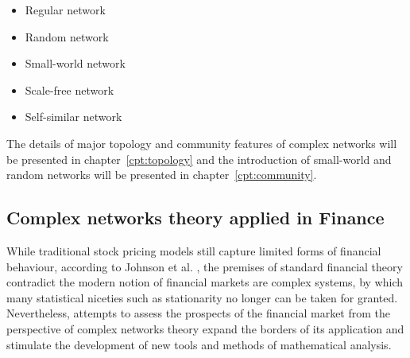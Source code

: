 \begin{itemize}
	\item Regular network
	\item Random network
	\item Small-world network
	\item Scale-free network
	\item Self-similar network
\end{itemize}

The details of major topology and community features of complex networks will be presented in chapter~\ref{cpt:topology} and the introduction of small-world and random networks will be presented in chapter~\ref{cpt:community}.

\subsection{Complex networks theory applied in Finance}
While traditional stock pricing models still capture limited forms of financial behaviour, according to Johnson et al. \cite{financialcomplex}, the premises of standard financial theory contradict the modern notion of financial markets are complex systems, by which many statistical niceties such as stationarity no longer can be taken for granted. Nevertheless, attempts to assess the prospects of the financial market from the perspective of complex networks theory expand the borders of its application and stimulate the development of new tools and methods of mathematical analysis.

